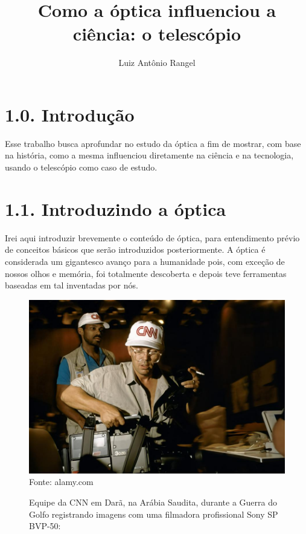 \documentclass[
  a4paper]{article}
\title{Como a óptica influenciou a ciência: o telescópio}
\author{Luiz Antônio Rangel}
\date{}
\begin{document}
\maketitle

\hypertarget{introduuxe7uxe3o}{%
\section{1.0. Introdução}\label{introduuxe7uxe3o}}

Esse trabalho busca aprofundar no estudo da óptica a fim de mostrar, com
base na história, como a mesma influenciou diretamente na ciência e na
tecnologia, usando o telescópio como caso de estudo.

\hypertarget{introduzindo-a-uxf3ptica}{%
\section{1.1. Introduzindo a óptica}\label{introduzindo-a-uxf3ptica}}

Irei aqui introduzir brevemente o conteúdo de óptica, para entendimento
prévio de conceitos básicos que serão introduzidos posteriormente. A
óptica é considerada um gigantesco avanço para a humanidade pois, com
exceção de nossos olhos e memória, foi totalmente descoberta e depois
teve ferramentas baseadas em tal inventadas por nós.

\begin{figure}[!h]
\centering
    \caption{Equipe da CNN em Darã, na Arábia Saudita, durante a Guerra
do Golfo registrando imagens com uma filmadora profissional Sony SP BVP-50:}
    \includegraphics[]{../_img/61881601c180a.jpg}
Fonte: alamy.com  
\end{figure}
\end{document}
